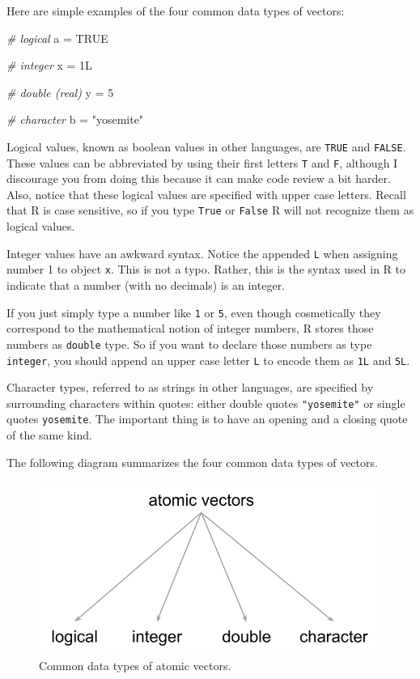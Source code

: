 \documentclass[
]{book}
\newenvironment{Shaded}{\begin{snugshade}}{\end{snugshade}}
\newcommand{\CommentTok}[1]{\textcolor[rgb]{0.56,0.35,0.01}{\textit{#1}}}
\newcommand{\ConstantTok}[1]{\textcolor[rgb]{0.00,0.00,0.00}{#1}}
\newcommand{\DecValTok}[1]{\textcolor[rgb]{0.00,0.00,0.81}{#1}}
\newcommand{\NormalTok}[1]{#1}
\newcommand{\OtherTok}[1]{\textcolor[rgb]{0.56,0.35,0.01}{#1}}
\newcommand{\StringTok}[1]{\textcolor[rgb]{0.31,0.60,0.02}{#1}}
\begin{document}
Here are simple examples of the four common data types of vectors:

\begin{Shaded}
\begin{Highlighting}[]
\CommentTok{\# logical}
\NormalTok{a }\OtherTok{=} \ConstantTok{TRUE}

\CommentTok{\# integer}
\NormalTok{x }\OtherTok{=}\NormalTok{ 1L}

\CommentTok{\# double (real)}
\NormalTok{y }\OtherTok{=} \DecValTok{5}

\CommentTok{\# character}
\NormalTok{b }\OtherTok{=} \StringTok{"yosemite"}
\end{Highlighting}
\end{Shaded}

Logical values, known as boolean values in other languages, are \texttt{TRUE} and
\texttt{FALSE}. These values can be abbreviated by using their first letters \texttt{T} and
\texttt{F}, although I discourage you from doing this because it can make code review
a bit harder. Also, notice that these logical values are specified with upper
case letters. Recall that R is case sensitive, so if you type \texttt{True} or \texttt{False}
R will not recognize them as logical values.

Integer values have an awkward syntax. Notice the appended \texttt{L} when assigning
number 1 to object \texttt{x}. This is not a typo. Rather, this is the syntax used in
R to indicate that a number (with no decimals) is an integer.

If you just simply type a number like \texttt{1} or \texttt{5}, even though cosmetically
they correspond to the mathematical notion of integer numbers, R stores those
numbers as \texttt{double} type. So if you want to declare those numbers as type
\texttt{integer}, you should append an upper case letter \texttt{L} to encode them as \texttt{1L}
and \texttt{5L}.

Character types, referred to as strings in other languages, are specified by
surrounding characters within quotes: either double quotes \texttt{"yosemite"} or
single quotes \texttt{\textquotesingle{}yosemite\textquotesingle{}}. The important thing is to have an opening and a
closing quote of the same kind.

The following diagram summarizes the four common data types of vectors.

\begin{figure}

{\centering \includegraphics[width=0.55\linewidth]{images/objects/obj-vector-atomic-types} 

}

\caption{Common data types of atomic vectors.}\label{fig:unnamed-chunk-18}
\end{figure}
\end{document}
